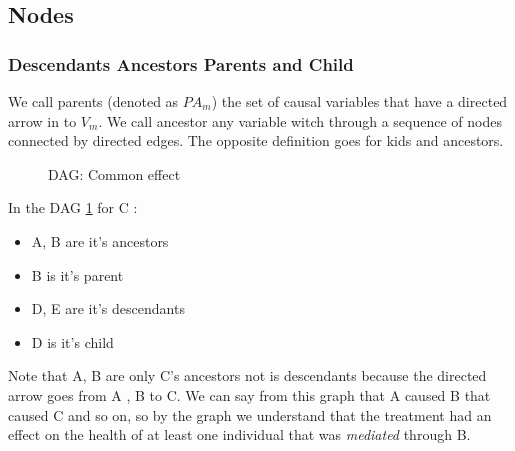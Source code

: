 \subsection{Nodes}

\subsubsection{Descendants Ancestors Parents and Child}
We call parents (denoted as $PA_m$) the set of causal variables that have a directed arrow in to $V_m$. We call ancestor any variable witch through a sequence of nodes connected by directed edges. The opposite definition goes for kids and ancestors. 

\begin{figure}[H]
\centering    
\caption{DAG: Common effect}
\label{DAG:term}
\end{figure}

In the DAG \ref{DAG:term} for C : 
\begin{itemize}
\item {A, B} are it's ancestors
\item {B} is it's parent
\item {D, E} are it's descendants
\item {D} is it's child
\end{itemize}
Note that {A, B} are only C's ancestors not is descendants because the directed arrow goes from {A , B} to C. 
We can say from this graph that A caused B that caused C and so on, so by the graph we understand that the treatment had an effect on the health of at least one individual that was \textit{mediated} through B.

